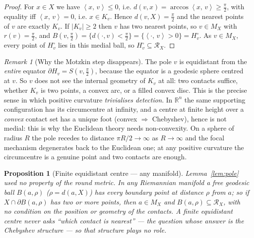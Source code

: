 \documentclass[11pt]{article}
\newtheorem{proposition}[theorem]{Proposition}
\theoremstyle{remark}
\newtheorem{remark}[theorem]{Remark}
\newcommand{\R}{\mathbb{R}}
\newcommand{\X}{X}
\newcommand{\Mx}{M_{\X}}
\newcommand{\Rx}{\mathcal{R}_{\X}}
\newcommand{\sca}[2]{\left\langle #1,\, #2\right\rangle}
\begin{document}
\begin{proof}
For $x\in\X$ we have $\sca{x}{v}\le0$, i.e. $d(v,x)=\arccos\sca{x}{v}\ge
\tfrac\pi2$, with equality iff $\sca{x}{v}=0$, i.e. $x\in K_{v}$. Hence
$d(v,\X)=\tfrac\pi2$ and the nearest points of $v$ are exactly $K_{v}$. If
$|K_{v}|\ge2$ then $v$ has two nearest points, so $v\in\Mx$ with
$r(v)=\tfrac\pi2$, and $B(v,\tfrac\pi2)=\{d(\cdot,v)<\tfrac\pi2\}=
\{\sca{\cdot}{v}>0\}=H_{v}^{\circ}$. As $v\in\Mx$, every point of
$H_{v}^{\circ}$ lies in this medial ball, so $H_{v}^{\circ}\subseteq\Rx$.
\end{proof}

\begin{remark}[Why the Motzkin step disappears]\label{rem:nomotzkin}
The pole $v$ is equidistant from the \emph{entire} equator
$\partial H_{v}=S(v,\tfrac\pi2)$, because the equator is a geodesic sphere
centred at $v$. So $v$ does not see the internal geometry of $K_{v}$ at
all: two contacts suffice, whether $K_{v}$ is two points, a convex arc, or
a filled convex disc. This is the precise sense in which positive
curvature \emph{trivialises detection}. In $\R^{n}$ the same supporting
configuration has its circumcentre at infinity, and a centre at finite
height over a \emph{convex} contact set has a unique foot
(convex $\Rightarrow$ Chebyshev), hence is not medial: this is why the
Euclidean theory needs non-convexity. On a sphere of radius $R$ the pole
recedes to distance $\pi R/2\to\infty$ as $R\to\infty$ and the
focal mechanism degenerates back to the Euclidean one; at any positive
curvature the circumcentre is a genuine point and two contacts are
enough.
\end{remark}

\begin{proposition}[Finite equidistant centre --- any manifold]
\label{prop:finitecentre}
Lemma~\ref{lem:pole} used no property of the round metric. In \emph{any}
Riemannian manifold a free geodesic ball $B(a,\rho)$ ($\rho=d(a,\X)$) has
every boundary point at distance $\rho$ from $a$; so if $\X\cap\partial
B(a,\rho)$ has two or more points, then $a\in\Mx$ and $B(a,\rho)\subseteq
\Rx$, with no condition on the position or geometry of the contacts. A
finite equidistant centre never asks ``which contact is nearest'' --- the
question whose answer is the Chebyshev structure --- so that structure plays
no role.
\end{proposition}
\end{document}
